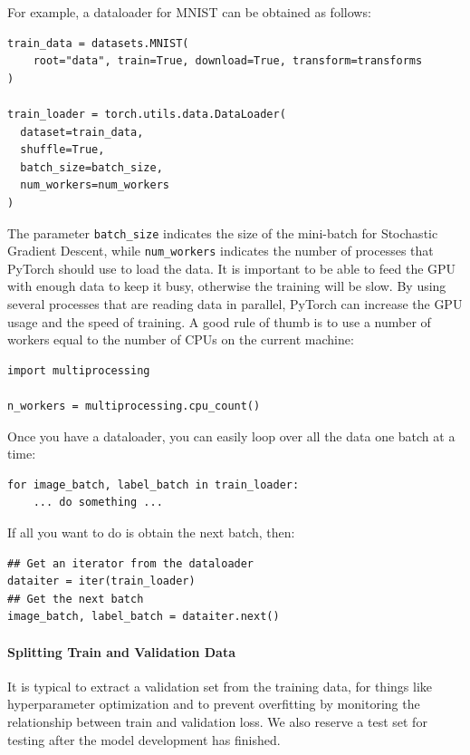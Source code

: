 For example, a dataloader for MNIST can be obtained as follows:
\begin{lstlisting}
train_data = datasets.MNIST(
    root="data", train=True, download=True, transform=transforms
)

train_loader = torch.utils.data.DataLoader(
  dataset=train_data, 
  shuffle=True, 
  batch_size=batch_size,
  num_workers=num_workers
)
\end{lstlisting}
The parameter \verb|batch_size| indicates the size of the mini-batch for Stochastic Gradient Descent, while \verb|num_workers| indicates the number of processes that PyTorch should use to load the data. It is important to be able to feed the GPU with enough data to keep it busy, otherwise the training will be slow. By using several processes that are reading data in parallel, PyTorch can increase the GPU usage and the speed of training. A good rule of thumb is to use a number of workers equal to the number of CPUs on the current machine:

\begin{lstlisting}
import multiprocessing

n_workers = multiprocessing.cpu_count()
\end{lstlisting}

Once you have a dataloader, you can easily loop over all the data one batch at a time:

\begin{lstlisting}
for image_batch, label_batch in train_loader:
    ... do something ...
\end{lstlisting}

If all you want to do is obtain the next batch, then:

\begin{lstlisting}
## Get an iterator from the dataloader
dataiter = iter(train_loader)
## Get the next batch
image_batch, label_batch = dataiter.next()
\end{lstlisting}

\paragraph{Splitting Train and Validation Data}

It is typical to extract a validation set from the training data, for things like hyperparameter optimization and to prevent overfitting by monitoring the relationship between train and validation loss. We also reserve a test set for testing after the model development has finished. \newline

